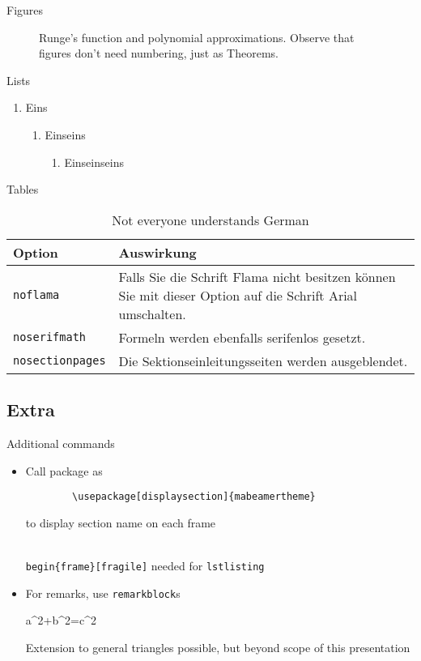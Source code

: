 \documentclass[12pt]{beamer}
\begin{document}
\begin{frame}{Figures}
\begin{figure}
\scalebox{0.6}{}
\caption{Runge's function and polynomial approximations. Observe that figures don't need numbering, just as Theorems.}
\end{figure}

\end{frame}
\begin{frame}{Lists}
\begin{enumerate}
\item Eins
\begin{enumerate}
\item Einseins
\begin{enumerate}
\item Einseinseins
\end{enumerate}
\end{enumerate}
\end{enumerate}
\end{frame}
\begin{frame}{Tables}
\begin{table}[]
\begin{tabularx}{\linewidth}{l>{\raggedright}X}
		\toprule
		\textbf{Option}			& \textbf{Auswirkung} \tabularnewline
		\midrule
		\texttt{noflama}		& Falls Sie die Schrift Flama nicht besitzen können Sie mit dieser Option auf die Schrift Arial umschalten. \tabularnewline
		\texttt{noserifmath}		& Formeln werden ebenfalls serifenlos gesetzt. \tabularnewline
		\texttt{nosectionpages} & Die Sektionseinleitungsseiten werden ausgeblendet.\tabularnewline
		\bottomrule
\end{tabularx}
\caption{Not everyone understands German}
\end{table}
\end{frame}
\subsection{Extra}
\begin{frame}[fragile]{Additional commands}
	\begin{itemize}
		\item Call package  as
		\begin{lstlisting}
		\usepackage[displaysection]{mabeamertheme}
		\end{lstlisting}
		to display section name on each frame
		\begin{alertblock}[\bigexclaim]
			 \texttt{\\begin\{frame\}[fragile]} needed for \texttt{lstlisting}
		\end{alertblock}
		
		\item For remarks, 	use \texttt{remarkblock}s
		\begin{equationblock}[Pythagoras]
			a^2+b^2=c^2
		\end{equationblock}
		\begin{remarkblock}
			Extension to general triangles possible, but beyond scope of this presentation
		\end{remarkblock}
	\end{itemize}

\end{frame}
\end{document}
